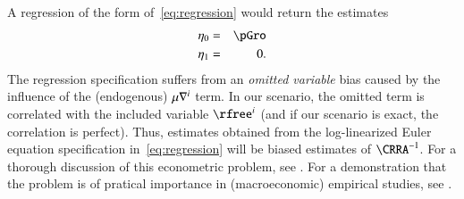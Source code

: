 \documentclass[titlepage,abstract]{\econtex}\newcommand{\texname}{ctDiscrete}
\begin{document}
A regression of the form of~\eqref{eq:regression} would return the estimates
\begin{eqnarray*}
        \eta_{0} & = & \pGro  \\
        \eta_{1} & = & 0.
\end{eqnarray*}
The regression specification suffers from an \textit{omitted variable} bias caused by the influence of the (endogenous) $\mu \nabla^{i}$ term. In our scenario, the omitted term is correlated with the included variable $\rfree^{i}$ (and if our scenario is exact, the correlation is perfect). Thus, estimates obtained  from the log-linearized Euler equation specification in~\eqref{eq:regression} will be biased estimates of $\CRRA^{-1}$.  For a thorough discussion of this econometric problem, see \cite{carroll:death}.  For a demonstration that the problem is of pratical importance in (macroeconomic) empirical studies, see \cite{ParkerPrestonPrecaution}.

\end{document}
